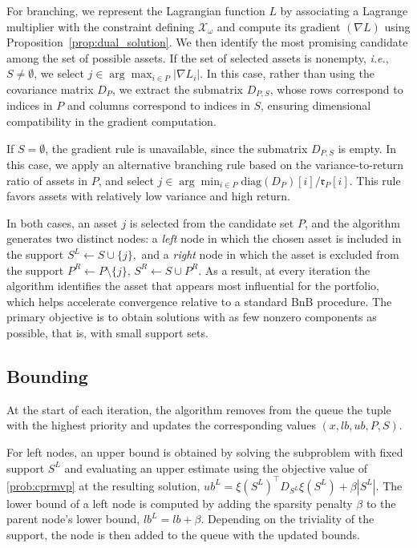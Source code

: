 \documentclass[11pt]{article}
\theoremstyle{plain}
\theoremstyle{definition}
\theoremstyle{plain}
\newcommand{\abs}[1]{\left\lvert#1\right\rvert}
\newcommand{\tpose}[1]{#1^{\top}}
\newcommand{\ccr}{{\mathfrak r}}
\newcommand{\cX}{{\mathcal X}}
\begin{document}
For branching, we represent the Lagrangian function $L$ by associating a Lagrange multiplier with the constraint defining $\cX_\omega$ and compute its gradient $(\nabla L)$ using Proposition~\ref{prop:dual_solution}. We then identify the most promising candidate among the set of possible assets. If the set of selected assets is nonempty, \textit{i.e.}, $S\neq\emptyset$, we select
$
j \in \arg\max_{i\in P} \abs{\nabla L_i}.
$
In this case, rather than using the covariance matrix $D_P$, we extract the submatrix $D_{P,S}$, whose rows correspond to indices in $P$ and columns correspond to indices in $S$, ensuring dimensional compatibility in the gradient computation.

If $S=\emptyset$, the gradient rule is unavailable, since the submatrix $D_{P,S}$ is empty. In this case, we apply an alternative branching rule based on the variance-to-return ratio of assets in $P$, and select
$
j \in \arg\min_{i\in P} \mathrm{diag}(D_P)[i] / \ccr_{P}[i].
$
This rule favors assets with relatively low variance and high return.

In both cases, an asset $j$ is selected from the candidate set $P$, and the algorithm generates two distinct nodes: a \emph{left} node in which the chosen asset is included in the support
$
S^L \leftarrow S \cup \{j\},
$
and a \emph{right} node in which the asset is excluded from the support
$
P^R \leftarrow P \setminus \{j\}$, $
S^R \leftarrow S \cup P^R
$.
As a result, at every iteration the algorithm identifies the asset that appears most influential for the portfolio, which helps accelerate convergence relative to a standard BnB procedure. The primary objective is to obtain solutions with as few nonzero components as possible, that is, with small support sets.
\subsection{Bounding}
At the start of each iteration, the algorithm removes from the queue the tuple with the highest priority and updates the corresponding values $(x, lb, ub, P, S)$.

For left nodes, an upper bound is obtained by solving the subproblem with fixed support $S^L$ and evaluating an upper estimate using the objective value of \eqref{prob:cprmvp} at the resulting solution, $ub^L=\tpose{\xi(S^L)}D_{S^L}\xi(S^L)+\beta|{S^L}|$. The lower bound of a left node is computed by adding the sparsity penalty $\beta$ to the parent node’s lower bound, $lb^L=lb+\beta$. Depending on the triviality of the support, the node is then added to the queue with the updated bounds.
\end{document}
